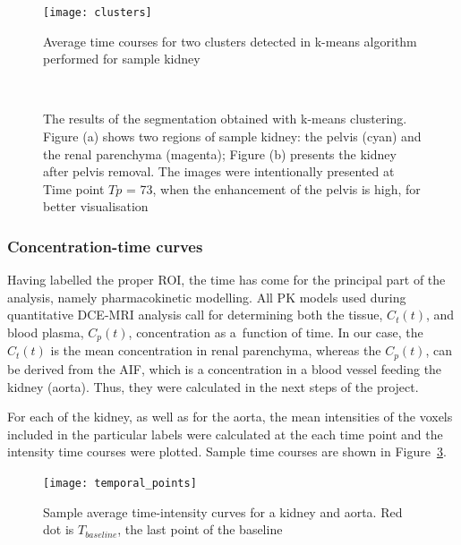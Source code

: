 \begin{figure}[H]
	\centering
	\texttt{[image: clusters]}
	
\caption[Average time courses for two clusters detected in k-means algorithm]{Average time courses for two clusters detected in k-means algorithm performed for sample kidney}
\label{fig:clusters}
\end{figure}

\begin{figure}[H]
\captionsetup[subfloat]{captionskip=0.5cm}
	\centering
	\hspace{0.02\textwidth}
	\\	
\vspace{0.5cm}
\caption[Sample kidney segmentation with k-means clustering]{The results of the segmentation obtained with k-means clustering. Figure (a) shows two regions of sample kidney: the pelvis (cyan) and the renal parenchyma (magenta); Figure (b) presents the kidney after pelvis removal. The images were intentionally presented at Time point $Tp$ = 73, when the enhancement of the pelvis is high, for better visualisation}
\label{fig:segmentation}
\end{figure}

\subsubsection{Concentration-time curves}
Having labelled the proper ROI, the time has come for the principal part of the analysis, namely pharmacokinetic modelling.
All PK models used during quantitative DCE-MRI analysis call for determining both the tissue, $C_t(t)$, and blood plasma, $C_p(t)$, concentration as a~function of time. In our case, the $C_t(t)$ is the mean concentration in renal parenchyma, whereas the
$C_p(t)$, can be derived from the AIF, which is a concentration in a blood vessel feeding the kidney (aorta).
Thus, they were calculated in the next steps of the project.  

For each of the kidney, as well as for the aorta, the mean intensities of the voxels included in the particular labels were calculated at the each time point and the intensity time courses were plotted. Sample time courses are shown in Figure~\ref{fig:temporal_points}.

\vspace{10pt}
\begin{figure}[H]
	\centering
	\texttt{[image: temporal\_points]}
	
\caption[Sample average time-intensity curves for a kidney and aorta with marked last points of the baseline]{Sample average time-intensity curves for a kidney and aorta. Red dot is $T_{baseline}$, the last point of the baseline}
\label{fig:temporal_points}
\end{figure}




